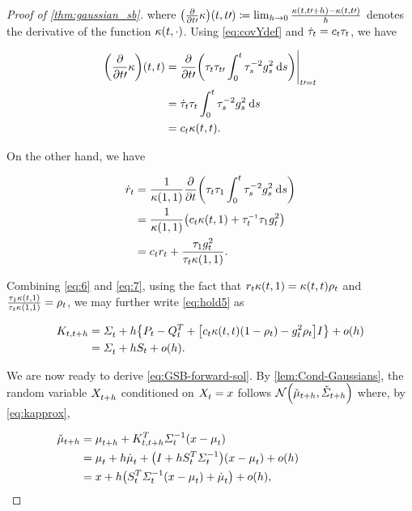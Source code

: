 \begin{proof}[Proof of \cref{thm:gaussian_sb}]
where $\parens*{\frac{\del}{\del \ctime\prime}\kernelbase }(\ctime,\ctime\prime) \defeq \lim_{h\to 0} \frac{ \kernel[\ctime][\ctime\prime+h] -\kernel[\ctime][\ctime\prime]}{h} $ denotes the derivative of the function $\kernel[\ctime][\cdot]$. Using \eqref{eq:covYdef} and $\daggtime=\drift \aggtime$, we have

\begin{align}
\parens*{\frac{\del}{\del \ctime\prime}\kernelbase }(\ctime, \ctime) &= \frac{\del}{\del \ctime\prime} \parens*{  \aggtime[\ctime]\aggtime[\ctime\prime] \intdasq }\Bigg\vert_{\ctime\prime = \ctime} \\
\nn
&= \daggtime\aggtime\intdasq \\
\label{eq:6}
&= \drift \kernel[\ctime][\ctime].
\end{align} 

On the other hand, we have

\begin{align}
\nn
\dratio &= \frac{1}{\kernel[\horizon][\horizon]} \frac{\del}{\del \ctime} \parens*{  \aggtime \aggtime[\horizon] \intdasq  } \\
\nn
&= \frac{1}{\kernel[\horizon][\horizon]} \parens*{  \drift \kernel[\ctime][\horizon] + \aggtimeinv[\ctime] \aggtime[\horizon]  \volatsq[\ctime] } \\
\label{eq:7}
&= \drift \ratio + \frac{ \aggtime[\horizon] \volatsq[\ctime]}{ \aggtime \kernel[\horizon][\horizon] }. 
\end{align}

Combining \eqref{eq:6} and \eqref{eq:7}, using the fact that $\ratio \kernel[\ctime][\horizon] = \kernel[\ctime][\ctime]\efftr$ and $\frac{ \aggtime[\horizon] \kernel[\ctime][\horizon] }{ \aggtime \kernel[\horizon][\horizon] } = \efftr$, we may further write \eqref{eq:hold5} as

\begin{align}
\nn
K_{\ctime, \ctime + h} &= \Sigmasol + h \braces*{  \Pt - \Qt^T  + \bracks*{\drift\kernel[\ctime][\ctime] \parens*{1- \efftr} - \volatsq[\ctime] \efftr} \eye } + o(h)  \\
\label{eq:kapprox}
&= \Sigmasol + h \St + o(h).
\end{align}


We are now ready to derive \eqref{eq:GSB-forward-sol}. By \cref{lem:Cond-Gaussians}, the random variable $\Xsol[\ctime+h]$ conditioned on $\Xsol = \point$ follows $\Ncal\parens*{  \muc, \Sigmac }$ where, by \eqref{eq:kapprox},

\begin{align}
\nn
\muc &= \meansol[\ctime+h] + \Kth^T  \Sigmasolinv\parens*{ \point - \meansol  } \\
\nn
&= \meansol + h \dmeansol + \parens*{ \eye + h \St^T  \Sigmasolinv } (\point - \meansol) + o(h) \hspace{20mm} \\
\label{eq:mucapprox}
&= \point + h \parens*{  \St^T  \Sigmasolinv\parens*{ \point - \meansol  } + \dmeansol } + o(h),
\end{align}


\end{proof}
